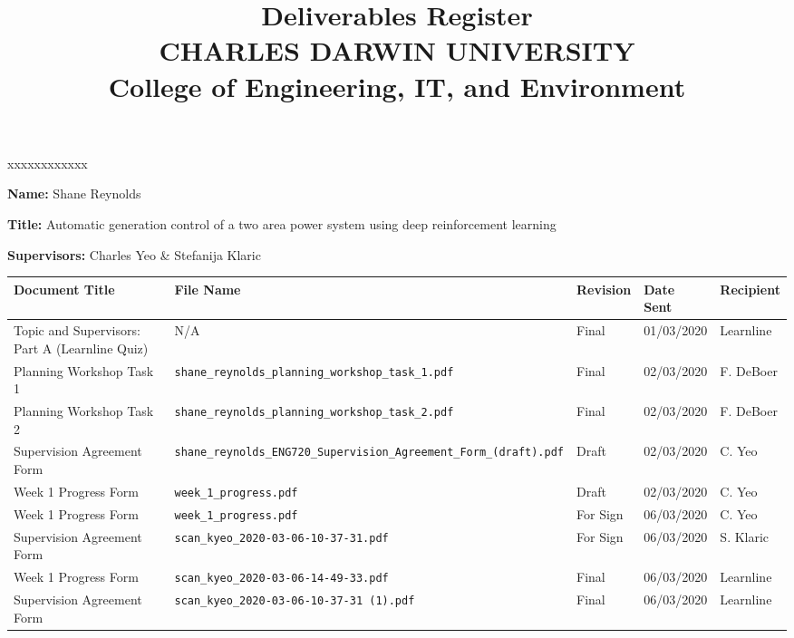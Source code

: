 \documentclass[10pt, landscape]{article}
\title{	
		Deliverables Register\\
		CHARLES DARWIN UNIVERSITY\\
		College of Engineering, IT, and Environment
	  }
\author{}
\date{}
\begin{document}
	
	\maketitle
	
	\begin{namelist}{xxxxxxxxxxxx}
		\item[{\bf Name:}]
			Shane Reynolds
		\item[{\bf Title:}]
			Automatic generation control of a two area power system using deep reinforcement learning
		\item[{\bf Supervisors:}]
			Charles Yeo \& Stefanija Klaric
	\end{namelist}
	
	\small
	\begin{tabular}{p{7cm}p{10cm}p{1.5cm}p{2cm}p{2cm}}
	\toprule
	\textbf{Document Title}							& \textbf{File Name}				& \textbf{Revision} & \textbf{Date Sent} 	& \textbf{Recipient} \\
	\midrule
	Topic and Supervisors: Part A (Learnline Quiz)	& N/A								& Final 			& 01/03/2020		 	& Learnline\\
	Planning Workshop Task 1						& \verb|shane_reynolds_planning_workshop_task_1.pdf|						& Final				& 02/03/2020		 	& F. DeBoer\\
	Planning Workshop Task 2						& \verb|shane_reynolds_planning_workshop_task_2.pdf|						& Final				& 02/03/2020			& F. DeBoer\\
	Supervision Agreement Form						& \verb|shane_reynolds_ENG720_Supervision_Agreement_Form_(draft).pdf|						& Draft				& 02/03/2020			& C. Yeo\\
	Week 1 Progress Form						& \verb|week_1_progress.pdf|						& Draft				& 02/03/2020			& C. Yeo\\
	Week 1 Progress Form							& \verb|week_1_progress.pdf|									& 				For Sign			& 06/03/2020			& C. Yeo\\
	Supervision Agreement Form						& \verb|scan_kyeo_2020-03-06-10-37-31.pdf|						& 				For Sign			& 06/03/2020			& S. Klaric\\
	Week 1 Progress Form							& \verb|scan_kyeo_2020-03-06-14-49-33.pdf|						& 				Final				& 06/03/2020			& Learnline\\
	Supervision Agreement Form						& \verb|scan_kyeo_2020-03-06-10-37-31 (1).pdf|					& 				Final				& 06/03/2020			& Learnline\\
	\bottomrule
	\end{tabular}
\end{document}
